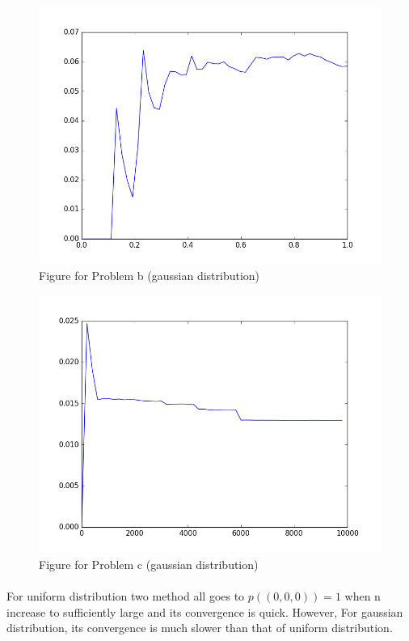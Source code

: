 \documentclass[]{article}
\begin{document}
    \begin{figure}[H]
        \centering
        \includegraphics[scale=0.4]{5_d_b.png}
        \caption{Figure for Problem b (gaussian distribution)}
    \end{figure}
    \begin{figure}[H]
        \centering
        \includegraphics[scale=0.4]{5_d_c.png}
        \caption{Figure for Problem c (gaussian distribution)}
    \end{figure}
    \paragraph{} For uniform distribution two method all goes to $p((0,0,0)) = 1$ when n increase to sufficiently large and its convergence is quick. However, For gaussian distribution, its convergence is much slower than that of uniform distribution.
\end{document}
